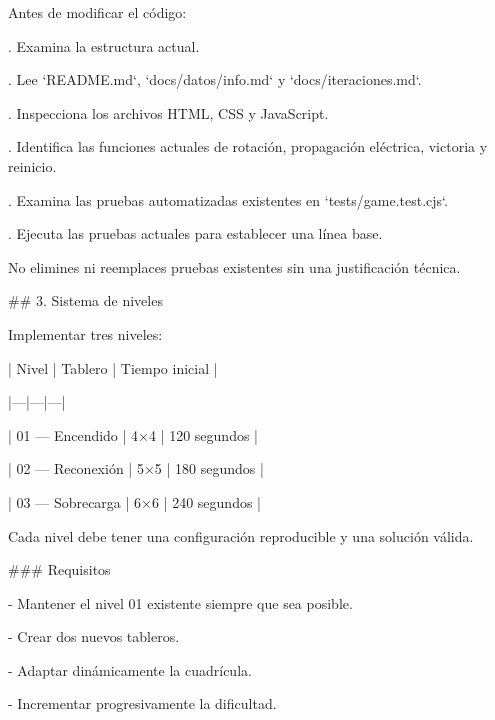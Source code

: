 \par\smallskip
\noindent Antes de modificar el código:\par
\par\smallskip
{}. Examina la estructura actual.\par
{}. Lee `README.md`, `docs/datos/info.md` y `docs/iteraciones.md`.\par
{}. Inspecciona los archivos HTML, CSS y JavaScript.\par
{}. Identifica las funciones actuales de rotación, propagación eléctrica, victoria y reinicio.\par
{}. Examina las pruebas automatizadas existentes en `tests/game.test.cjs`.\par
{}. Ejecuta las pruebas actuales para establecer una línea base.\par
\par\smallskip
\noindent No elimines ni reemplaces pruebas existentes sin una justificación técnica.\par
\par\smallskip
\noindent \#\# 3. Sistema de niveles\par
\par\smallskip
\noindent Implementar tres niveles:\par
\par\smallskip
\noindent | Nivel | Tablero | Tiempo inicial |\par
\noindent |---|---|---|\par
\noindent | 01 — Encendido | 4×4 | 120 segundos |\par
\noindent | 02 — Reconexión | 5×5 | 180 segundos |\par
\noindent | 03 — Sobrecarga | 6×6 | 240 segundos |\par
\par\smallskip
\noindent Cada nivel debe tener una configuración reproducible y una solución válida.\par
\par\smallskip
\noindent \#\#\# Requisitos\par
\par\smallskip
\noindent - Mantener el nivel 01 existente siempre que sea posible.\par
\noindent - Crear dos nuevos tableros.\par
\noindent - Adaptar dinámicamente la cuadrícula.\par
\noindent - Incrementar progresivamente la dificultad.\par
